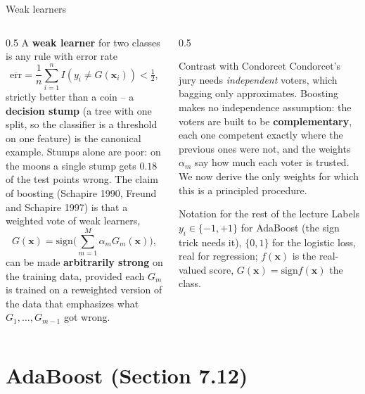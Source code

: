 \documentclass[10pt,aspectratio=169]{beamer}
\newcommand{\err}{\overline{\mathrm{err}}}
\newcommand{\sgn}{\mathrm{sign}}
\begin{document}
\begin{frame}{Weak learners}
\footnotesize
\begin{columns}[T]
\begin{column}{0.5\textwidth}
A \textbf{weak learner} for two classes is any rule with error rate
\[
\err=\frac1n\sum_{i=1}^n I(y_i\neq G(\bm{x}_i))<\tfrac12 ,\tag{7.21}
\]
strictly better than a coin -- a \textbf{decision stump} (a tree with one
split, so the classifier is a threshold on one feature) is the canonical
example.  Stumps alone are poor: on the moons a single stump gets $0.18$ of
the test points wrong.  The claim of boosting (Schapire 1990, Freund and
Schapire 1997) is that a weighted vote of weak learners,
\[
G(\bm{x})=\sgn\Big(\sum_{m=1}^M\alpha_m G_m(\bm{x})\Big),\tag{7.22}
\]
can be made \textbf{arbitrarily strong} on the training data, provided each
$G_m$ is trained on a reweighted version of the data that emphasizes what
$G_1,\dots,G_{m-1}$ got wrong.
\end{column}
\begin{column}{0.5\textwidth}
\begin{block}{Contrast with Condorcet}
Condorcet's jury needs \emph{independent} voters, which bagging only
approximates.  Boosting makes no independence assumption: the voters are
built to be \textbf{complementary}, each one competent exactly where the
previous ones were not, and the weights $\alpha_m$ say how much each voter is
trusted.  We now derive the only weights for which this is a principled
procedure.
\end{block}
\begin{block}{Notation for the rest of the lecture}
Labels $y_i\in\{-1,+1\}$ for AdaBoost (the sign trick needs it), $\{0,1\}$
for the logistic loss, real for regression; $f(\bm{x})$ is the real-valued
score, $G(\bm{x})=\sgn f(\bm{x})$ the class.
\end{block}
\end{column}
\end{columns}
\end{frame}

\section{AdaBoost (Section 7.12)}
\end{document}
